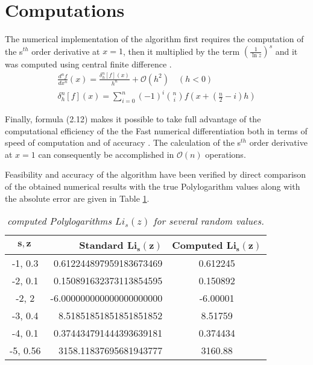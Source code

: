 \documentclass{amsart}
\begin{document}
\section{Computations}


The numerical implementation of the algorithm first requires the computation of the s$^{th}$ order derivative at $x=1$, then it multiplied by the term $(\frac{1}{\ln{z}})^s$ and it was computed using central finite difference \cite{comp} \cite{cent}.
\begin{align}
    \frac{d^nf}{dx^n}(x)=\frac{\delta^{n}_{h}[f](x)}{h^n}+\mathcal{O}(h^2)\quad (h<0)\\
    \delta^{n}_{h}[f](x)=\sum^n_{i=0}(-1)^i\binom{n}{i}f(x+(\frac{n}{2}-i)h)
\end{align}

Finally, formula (2.12) makes it possible to take full advantage of the computational efficiency of the 
the Fast numerical differentiation both in terms of speed of computation and of accuracy \cite{comp}. 
The calculation of the s$^{th}$ order derivative at $x=1$ can consequently be accomplished 
in $\mathcal{O}(n)$ operations.


Feasibility and accuracy of the algorithm have been verified by direct comparison 
of the obtained numerical results with the true Polylogarithm
values along with the absolute error are given
in Table \ref{tab:1}.
\begin{table}[p]
\caption{\label{tab:1} \it computed Polylogarithms $Li_s(z)$ for several random values.}

\begin{tabular}{|c|r|c|}    
\hline
\rule{0pt}{4ex} $\boldsymbol{s, z\,}$ 
& \bf Standard $\boldsymbol{Li_{s}(z)}$ \hspace{0.6cm} & \bf Computed $\boldsymbol{Li_{s}(z)}$ \\[+5pt]
\hline\rule{0pt}{3ex}
-1, 0.3  & 0.612244897959183673469 & 0.612245 \\[+5pt]
-2, 0.1  & 0.150891632373113854595 & 0.150892 \\[+5pt]
-2, 2    &-6.000000000000000000000 & -6.00001\\[+5pt] 
-3, 0.4   & 8.51851851851851851852 & 8.51759 \\[+5pt]
-4, 0.1  &0.374434791444393639181 & 0.374434 \\[+5pt]
-5, 0.56 & 3158.11837695681943777 & 3160.88 \\[+5pt]


\hline
\end{tabular} 
\end{table}
\end{document}
